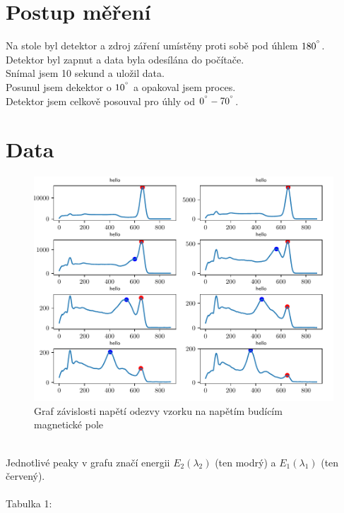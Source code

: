 \documentclass{article}
\begin{document}
\section{Postup měření}
Na stole byl detektor a zdroj záření umístěny proti sobě pod úhlem $180^{\degree}$.\\
Detektor byl zapnut a data byla odesílána do počítače.\\
Snímal jsem 10 sekund a uložil data.\\
Posunul jsem dekektor o $10^{\degree}$ a opakoval jsem proces.\\
Detektor jsem celkově posouval pro úhly od $0^{\degree} - 70^{\degree}$.
\newpage
\section{Data}
\begin{figure}[h]
  \hspace*{-1em}
  \includegraphics[scale=0.8]{figs/fig1.pdf}
  \caption{Graf závislosti napětí odezvy vzorku na napětím budícím magnetické pole}
\end{figure}
\\
Jednotlivé peaky v grafu značí energii $E_{2}(\lambda_{2})$ (ten modrý) a $E_{1}(\lambda_{1})$ (ten červený).\\
\\
\footnotesize{Tabulka 1:}\\
\end{document}
